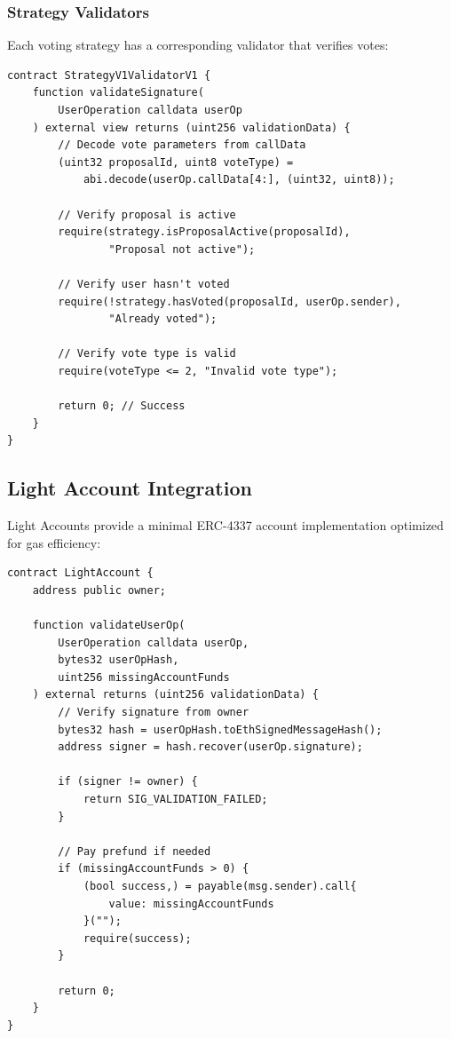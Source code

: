 \subsubsection{Strategy Validators}

Each voting strategy has a corresponding validator that verifies votes:

\begin{lstlisting}[caption=StrategyV1 Validator]
contract StrategyV1ValidatorV1 {
    function validateSignature(
        UserOperation calldata userOp
    ) external view returns (uint256 validationData) {
        // Decode vote parameters from callData
        (uint32 proposalId, uint8 voteType) =
            abi.decode(userOp.callData[4:], (uint32, uint8));

        // Verify proposal is active
        require(strategy.isProposalActive(proposalId),
                "Proposal not active");

        // Verify user hasn't voted
        require(!strategy.hasVoted(proposalId, userOp.sender),
                "Already voted");

        // Verify vote type is valid
        require(voteType <= 2, "Invalid vote type");

        return 0; // Success
    }
}
\end{lstlisting}

\subsection{Light Account Integration}

Light Accounts \cite{lightaccount} provide a minimal ERC-4337 account implementation optimized for gas efficiency:

\begin{lstlisting}[caption=Light Account Structure]
contract LightAccount {
    address public owner;

    function validateUserOp(
        UserOperation calldata userOp,
        bytes32 userOpHash,
        uint256 missingAccountFunds
    ) external returns (uint256 validationData) {
        // Verify signature from owner
        bytes32 hash = userOpHash.toEthSignedMessageHash();
        address signer = hash.recover(userOp.signature);

        if (signer != owner) {
            return SIG_VALIDATION_FAILED;
        }

        // Pay prefund if needed
        if (missingAccountFunds > 0) {
            (bool success,) = payable(msg.sender).call{
                value: missingAccountFunds
            }("");
            require(success);
        }

        return 0;
    }
}
\end{lstlisting}

